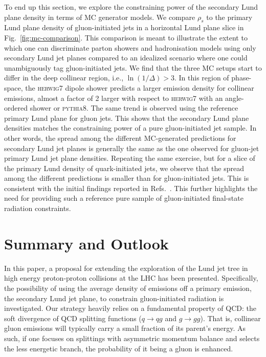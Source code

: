 \documentclass[a4paper,11pt]{article}
\newcommand{\py}{{\textsc{pythia}}8\xspace}
\newcommand{\hw}{{\textsc{herwig}}7\xspace}
\begin{document}
To end up this section, we explore the constraining power of the secondary Lund plane density in terms of MC generator models. We compare $\rho_s$ to the primary Lund plane density of gluon-initiated jets in a horizontal Lund plane slice in Fig.~\ref{fig:mc-comparison}. This comparison is meant to illustrate the extent to which one can discriminate parton showers and hadronisation models using only secondary Lund jet planes compared to an idealized scenario where one could unambiguously tag gluon-initiated jets. We find that the three MC setups start to differ in the deep collinear region, i.e., $\ln(1/\Delta)>3$. In this region of phase-space, the \hw dipole shower predicts a larger emission density for collinear emissions, almost a factor of 2 larger with respect to \hw with an angle-ordered shower or \py. The same trend is observed using the reference primary Lund plane for gluon jets. This shows that the secondary Lund plane densities matches the constraining power of a pure gluon-initiated jet sample. In other words, the spread among the different MC-generated predictions for secondary Lund jet planes is generally the same as the one observed for gluon-jet primary Lund jet plane densities. Repeating the same exercise, but for a slice of the primary Lund density of quark-initiated jets, we observe that the spread among the different predictions is smaller than for gluon-initiated jets. This is consistent with the initial findings reported in Refs.~\cite{Andersen:2016qtm, Gras:2017jty}. This further highlights the need for providing such a reference pure sample of gluon-initiated final-state radiation constraints.

\section{Summary and Outlook}
\label{sec:end}
In this paper, a proposal for extending the exploration of the Lund jet tree in high energy proton-proton collisions at the LHC has been presented. Specifically, the possibility of using the average density of emissions off a primary emission, the secondary Lund jet plane, to constrain gluon-initiated radiation is investigated. Our strategy heavily relies on a fundamental property of QCD: the soft divergence of QCD splitting functions ($q\to qg$ and $g\to gg$). That is, collinear gluon emissions will typically carry a small fraction of its parent's energy. As such, if one focuses on splittings with asymmetric momentum balance and selects the less energetic branch, the probability of it being a gluon is enhanced. 
\end{document}
